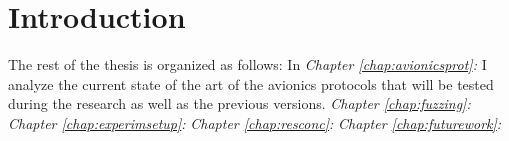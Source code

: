 \documentclass[../main.tex]{subfiles}
\begin{document}
\chapter{Introduction}


The rest of the thesis is organized as follows:
\newline
In \textit{Chapter \ref{chap:avionicsprot}: } I analyze the current state of the art of the avionics protocols that will be tested during the research as well as the previous versions.
\newline
\textit{Chapter \ref{chap:fuzzing}: }
\newline
\textit{Chapter \ref{chap:experimsetup}: }
\newline
\textit{Chapter \ref{chap:resconc}: }
\newline
\textit{Chapter \ref{chap:futurework}: }
\newline
\end{document}
